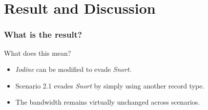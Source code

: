 \documentclass{beamer}
\begin{document}

\section{Result and Discussion}

\begin{frame}
\frametitle{What is the result?}

\begin{table}[H]
    \centering
    \label{tab:result_summary}
\end{table}

\pause

What does this mean?

\pause

\begin{itemize}
    \item<1-> \textit{Iodine} can be modified to evade \textit{Snort}.
    \item<4-> Scenario 2.1 evades \textit{Snort} by simply using another record type.
    \item<5-> The bandwidth remains virtually unchanged across scenarios.
\end{itemize}

\end{frame}
\end{document}
